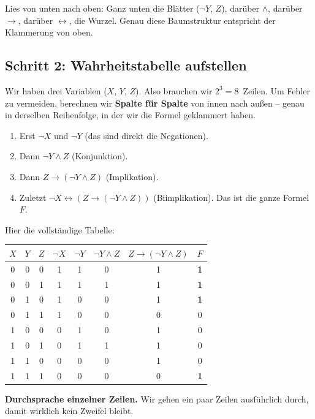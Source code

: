 \documentclass[a4paper,12pt]{article}
\begin{document}
Lies von unten nach oben: Ganz unten die Bl\"atter ($\neg Y$, $Z$),
dar\"uber $\wedge$, dar\"uber $\to$, dar\"uber $\leftrightarrow$, die
Wurzel. Genau diese Baumstruktur entspricht der Klammerung von oben.

\subsection*{Schritt 2: Wahrheitstabelle aufstellen}

Wir haben drei Variablen ($X$, $Y$, $Z$). Also brauchen wir
$2^3 = 8$~Zeilen. Um Fehler zu vermeiden, berechnen wir
\textbf{Spalte f\"ur Spalte} von innen nach au{\ss}en -- genau in
derselben Reihenfolge, in der wir die Formel geklammert haben.

\begin{enumerate}[nosep]
\item Erst $\neg X$ und $\neg Y$ (das sind direkt die Negationen).
\item Dann $\neg Y \wedge Z$ (Konjunktion).
\item Dann $Z \to (\neg Y \wedge Z)$ (Implikation).
\item Zuletzt $\neg X \leftrightarrow (Z \to (\neg Y \wedge Z))$
      (Biimplikation). Das ist die ganze Formel $F$.
\end{enumerate}

Hier die vollst\"andige Tabelle:

\begin{center}
\renewcommand{\arraystretch}{1.2}
\begin{tabular}{ccc|c|c|c|c|c}
\toprule
$X$ & $Y$ & $Z$ & $\neg X$ & $\neg Y$ & $\neg Y \wedge Z$ &
$Z \to (\neg Y \wedge Z)$ & $F$ \\
\midrule
0 & 0 & 0 & 1 & 1 & 0 & 1 & \textbf{1} \\
0 & 0 & 1 & 1 & 1 & 1 & 1 & \textbf{1} \\
0 & 1 & 0 & 1 & 0 & 0 & 1 & \textbf{1} \\
0 & 1 & 1 & 1 & 0 & 0 & 0 & 0 \\
1 & 0 & 0 & 0 & 1 & 0 & 1 & 0 \\
1 & 0 & 1 & 0 & 1 & 1 & 1 & 0 \\
1 & 1 & 0 & 0 & 0 & 0 & 1 & 0 \\
1 & 1 & 1 & 0 & 0 & 0 & 0 & \textbf{1} \\
\bottomrule
\end{tabular}
\end{center}

\textbf{Durchsprache einzelner Zeilen.} Wir gehen ein paar Zeilen
ausf\"uhrlich durch, damit wirklich kein Zweifel bleibt.
\end{document}
